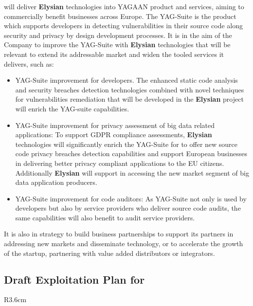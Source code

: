 \documentclass[a4paper,11pt]{article}
\newcommand{\project}[1]{\textbf{#1}\xspace}
\newcommand{\SECURITY}{\project{Elysian}}
\newcommand{\TheProject}{\SECURITY}
\begin{document}
 \YAGshort{} will deliver \TheProject technologies into YAGAAN product and services, aiming to commercially benefit businesses across Europe. The YAG-Suite is the \YAGshort{} product which supports developers in detecting vulnerabilities in their source code along security and privacy by design development processes. It is in the aim of the Company to improve the YAG-Suite with \TheProject technologies that will be relevant to extend its addressable market and widen the tooled services it delivers, such as:
\begin{itemize}
    \item YAG-Suite improvement for developers. The enhanced static code analysis and security breaches detection technologies combined with novel techniques for vulnerabilities remediation that will be developed in the \TheProject project will enrich the YAG-suite capabilities.
    \item YAG-Suite improvement for privacy assessment of big data related applications: To support GDPR compliance assessments, \TheProject technologies will significantly enrich the YAG-Suite for \YAGshort{} to offer new source code privacy breaches detection capabilities and support European businesses in delivering better privacy compliant applications to the EU citizens. Additionally \TheProject will support \YAGshort{} in accessing the new market segment of big data application producers.
    \item YAG-Suite improvement for code auditors: As YAG-Suite not only is used by developers but also by service providers who deliver source code audits, the same capabilities will also benefit to audit service providers.
\end{itemize}
It is also in \YAGshort{} strategy to build business partnerships to support its partners in addressing new markets and disseminate \YAGshort{} technology, or to accelerate the growth of the startup, partnering with value added distributors or integrators.

\horizontalline

\subsection*{Draft Exploitation Plan for \COGNIshort{}}
\vspace{-6pt}

\begin{wrapfigure}{R}{3.6cm}
\vspace{-1.3cm}
\hfill {}
\vspace{-0.8cm}
\end{wrapfigure}
\end{document}
